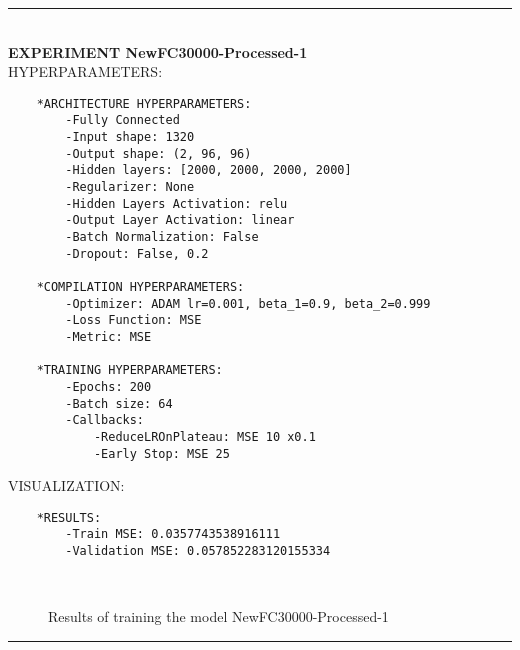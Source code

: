 \rule{0.5\textwidth}{0.5pt}\\

	{\large \textbf{EXPERIMENT NewFC30000-Processed-1}}\\
	
	{\normalsize HYPERPARAMETERS:}
	\begin{lstlisting}	
	*ARCHITECTURE HYPERPARAMETERS:
		-Fully Connected
		-Input shape: 1320
		-Output shape: (2, 96, 96)
		-Hidden layers: [2000, 2000, 2000, 2000]
		-Regularizer: None
		-Hidden Layers Activation: relu
		-Output Layer Activation: linear
		-Batch Normalization: False
		-Dropout: False, 0.2
	
	*COMPILATION HYPERPARAMETERS:
		-Optimizer: ADAM lr=0.001, beta_1=0.9, beta_2=0.999
		-Loss Function: MSE
		-Metric: MSE
	
	*TRAINING HYPERPARAMETERS:
		-Epochs: 200
		-Batch size: 64
		-Callbacks: 
			-ReduceLROnPlateau: MSE 10 x0.1
			-Early Stop: MSE 25
	\end{lstlisting}
	
	{\normalsize VISUALIZATION:}
	\begin{lstlisting}
	*RESULTS:
        -Train MSE: 0.0357743538916111
        -Validation MSE: 0.057852283120155334
	\end{lstlisting}
	
	\begin{figure*}[ht!]
		\hspace{\fill}
		\hspace{\fill}
		\\
		\caption{Results of training the model NewFC30000-Processed-1}
	\end{figure*}
	
	
\rule{0.5\textwidth}{0.5pt}\\